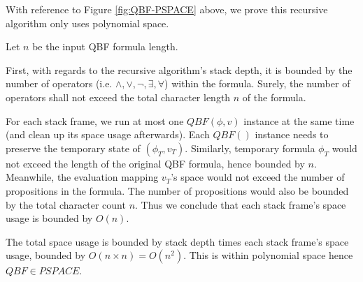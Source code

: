 \documentclass[12pt]{article}
\begin{document}
With reference to Figure \ref{fig:QBF-PSPACE} above, we prove this recursive algorithm only uses polynomial space.

Let $n$ be the input QBF formula length.

First, with regards to the recursive algorithm's stack depth, it is bounded by the number of operators (i.e. $\land, \lor, \lnot, \exists, \forall$) within the formula. Surely, the number of operators shall not exceed the total character length $n$ of the formula.

For each stack frame, we run at most one $QBF(\phi, v)$ instance at the same time (and clean up its space usage afterwards). Each $QBF()$ instance needs to preserve the temporary state of $(\phi_T, v_T)$. Similarly, temporary formula $\phi_T$ would not exceed the length of the original QBF formula, hence bounded by $n$. Meanwhile, the evaluation mapping $v_T$'s space would not exceed the number of propositions in the formula. The number of propositions would also be bounded by the total character count $n$. Thus we conclude that each stack frame's space usage is bounded by $O(n)$.

The total space usage is bounded by stack depth times each stack frame's space usage, bounded by $O(n \times n) = O(n^2)$. This is within polynomial space hence $QBF \in PSPACE$.
\end{document}
